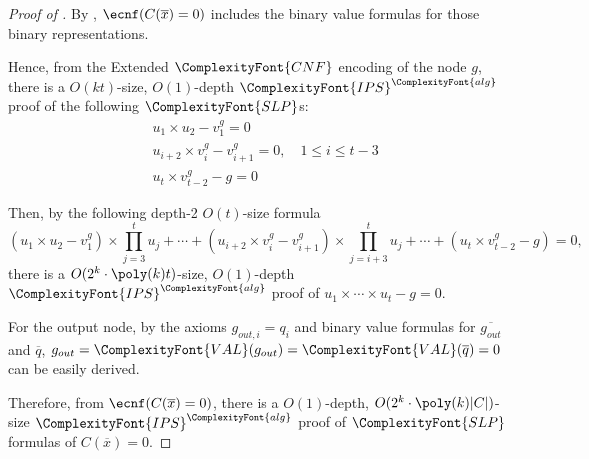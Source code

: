 \documentclass[11pt,letter]{article}
\theoremstyle{remark} %
\newcommand{\alg}{\ComplexityFont{alg}}
\newcommand{\IPS}{%
    {
        \ComplexityFont{IPS} 
    }
}
\newcommand{\CNF}{ %
    {
        \ComplexityFont{CNF}
    }
}
\newcommand{\VAL}{ %
    {
        \ComplexityFont{VAL}
    }
}
\newcommand{\SLP}{ %
    {
        \ComplexityFont{SLP}
    }
}
\begin{document}
{\begin{proof}[Proof of ]
        By , $\ecnf(C(\overline{x})=0)$ includes the binary value formulas for those binary representations. 


        Hence, from the Extended $\CNF$ encoding of the node $g$, there is a $O(k t)$-size, $O(1)$-depth $\IPS^\alg$ proof of the following $\SLP$s:
        \begin{align*}
            & u_1 \times u_2 - v_1^g = 0 \\
            & u_{i+2} \times v_i^g - v_{i+1}^g = 0, \quad 1 \leq i \leq t-3 \\
            & u_t \times v_{t-2}^g - g = 0
        \end{align*}

        Then, by the following depth-2 $O(t)$-size formula
        \[
            (u_1 \times u_2 - v_1^g ) \times \prod_{j=3}^t u_j + \cdots +(u_{i+2} \times v_i^g - v_{i+1}^g) \times \prod_{j=i+3}^t u_{j} + \cdots + (u_t \times v_{t-2}^g - g)=0,
        \]
        there is a $O(2^k \cdot \poly(k) t)$-size, $O(1)$-depth $\IPS^\alg$ proof of $u_1 \times \cdots \times u_t  - g =0$.
    
        For the output node, by the axioms $g_{out,i}=q_i$ and binary value formulas for $\overline{g_{out}}$ and $\overline{q}$, $g_{out}=\VAL(g_{out})=\VAL(\overline{q})=0$ can be easily derived.

        Therefore, from $\ecnf(C(\overline{x})=0)$, there is a $O(1)$-depth, $O(2^k \cdot \poly(k) |C|)$-size $\IPS^\alg$ proof of $\SLP$ formulas of $C(\overline{x})=0$. 
        

\end{proof}}
\end{document}
